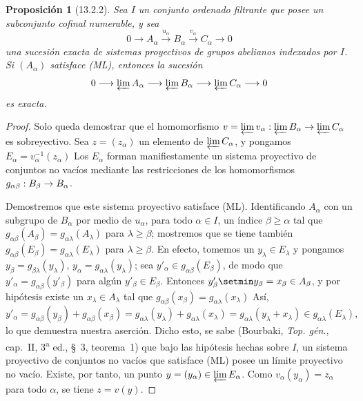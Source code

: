 \documentclass[10pt,oneside,openany]{book}
\theoremstyle{egaenv}\newtheorem*{env}{---}
\theoremstyle{egastatement}
\newtheorem*{proposition}{Proposición}
\theoremstyle{egadescription}
\renewcommand{\geq}{\geqslant}
\renewcommand{\to}{\mathchoice{\longrightarrow}{\rightarrow}{\rightarrow}{\rightarrow}}
\begin{document}
\begin{proposition}[13.2.2]
\label{0.13.2.2}
\label{0.13.2.2-fr}
Sea $I$ un conjunto ordenado filtrante que posee un subconjunto
cofinal numerable, y sea
\[
0\longrightarrow A_\alpha\xrightarrow{u_\alpha}B_\alpha
\xrightarrow{v_\alpha}C_\alpha\longrightarrow0
\]
una sucesión exacta de sistemas proyectivos de grupos abelianos indexados
por $I$.
Si $(A_\alpha)$ satisface {\rm(ML)}, entonces la sucesión
\[
0\longrightarrow\varprojlim A_\alpha
\longrightarrow\varprojlim B_\alpha
\longrightarrow\varprojlim C_\alpha\longrightarrow0
\]
es exacta.
\end{proposition}

\begin{proof}
Solo queda demostrar que el homomorfismo
$v=\varprojlim v_\alpha:\varprojlim B_\alpha\to\varprojlim C_\alpha$ es sobreyectivo. Sea $z=(z_\alpha)$ un elemento de $\varprojlim C_\alpha$, y pongamos
$E_\alpha=v_\alpha^{-1}(z_\alpha)$
Los $E_\alpha$ forman manifiestamente un sistema proyectivo de conjuntos no
vacíos mediante las restricciones de los homomorfismos
$g_{\alpha\beta}:B_\beta\to B_\alpha$.

Demostremos que este sistema proyectivo satisface (ML).
Identificando $A_\alpha$ con un subgrupo de $B_\alpha$ por medio de
$u_\alpha$, para todo $\alpha\in I$, un índice
$\beta\geq\alpha$ tal que $g_{\alpha\beta}(A_\beta)=g_{\alpha\lambda}(A_\lambda)$ para $\lambda\geq\beta$; mostremos que se tiene también $g_{\alpha\beta}(E_\beta)=g_{\alpha\lambda}(E_\lambda)$ para $\lambda\geq\beta$. En efecto, tomemos un $y_\lambda\in E_\lambda$ y pongamos $y_\beta=g_{\beta\lambda}(y_\lambda)$, $y_\alpha=g_{\alpha\lambda}(y_\lambda)$; sea $y'_\alpha\in g_{\alpha\beta}(E_\beta)$, de modo que
$y'_\alpha=g_{\alpha\beta}(y'_\beta)$ para algún
$y'_\beta\in E_\beta$.
Entonces $y'_\beta\setmin y_\beta=x_\beta\in A_\beta$, y por hipótesis existe
un $x_\lambda\in A_\lambda$ tal que
$g_{\alpha\beta}(x_\beta)=g_{\alpha\lambda}(x_\lambda)$
Así,
\[
y'_\alpha=g_{\alpha\beta}(y_\beta)+g_{\alpha\beta}(x_\beta)
=g_{\alpha\lambda}(y_\lambda)+g_{\alpha\lambda}(x_\lambda)
=g_{\alpha\lambda}(y_\lambda+x_\lambda)
\in g_{\alpha\lambda}(E_\lambda),
\] lo que demuestra nuestra aserción. Dicho esto, se sabe (Bourbaki, \emph{Top. gén.}, cap.~II, 3\textsuperscript{a} ed., §~3, teorema~1) que bajo las hipótesis hechas sobre $I$, un sistema proyectivo de conjuntos no vacíos que satisface (ML)
posee un límite proyectivo no vacío.
Existe, por tanto, un punto
$y=(y_\alpha)\in\varprojlim E_\alpha$.
Como $v_\alpha(y_\alpha)=z_\alpha$ para todo $\alpha$, se tiene
$z=v(y)$.
\end{proof}
\end{document}

